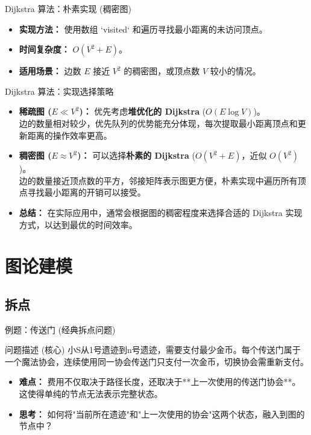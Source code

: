 \documentclass[11pt]{beamer}
\begin{document}
\begin{frame}
    Dijkstra 算法：朴素实现 (稠密图)
    \begin{itemize}
        \item \textbf{实现方法：} 使用数组 `visited` 和遍历寻找最小距离的未访问顶点。
        \item \textbf{时间复杂度：} $O(V^2 + E)$。
        \item \textbf{适用场景：} 边数 $E$ 接近 $V^2$ 的稠密图，或顶点数 $V$ 较小的情况。
    \end{itemize}
\end{frame}

\begin{frame}
    Dijkstra 算法：实现选择策略
    \begin{itemize}
        \item \textbf{稀疏图 ($E \ll V^2$)：} 优先考虑\textbf{堆优化的 Dijkstra} ($O(E \log V)$)。\\
        边的数量相对较少，优先队列的优势能充分体现，每次提取最小距离顶点和更新距离的操作效率更高。
        \item \textbf{稠密图 ($E \approx V^2$)：} 可以选择\textbf{朴素的 Dijkstra} ($O(V^2 + E)$，近似 $O(V^2)$)。\\
        边的数量接近顶点数的平方，邻接矩阵表示图更方便，朴素实现中遍历所有顶点寻找最小距离的开销可以接受。
        \item \textbf{总结：} 在实际应用中，通常会根据图的稠密程度来选择合适的 Dijkstra 实现方式，以达到最优的时间效率。
    \end{itemize}
\end{frame}

\section{图论建模}
\subsection{拆点}
\begin{frame}{例题：传送门 (经典拆点问题)}
    \begin{block}{问题描述 (核心)} 
        小S从1号遗迹到n号遗迹，需要支付最少金币。每个传送门属于一个魔法协会，连续使用同一协会传送门只支付一次金币，切换协会需重新支付。
    \end{block}
    \begin{itemize}
        \item \textbf{难点：} 费用不仅取决于路径长度，还取决于**上一次使用的传送门协会**。这使得单纯的节点无法表示完整状态。
        \item \textbf{思考：} 如何将"当前所在遗迹"和"上一次使用的协会"这两个状态，融入到图的节点中？
    \end{itemize}
\end{frame}
\end{document}
